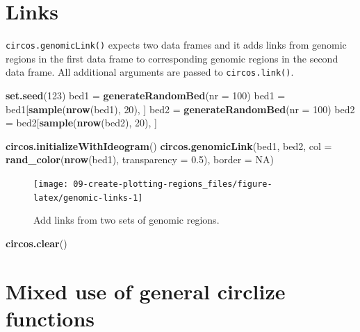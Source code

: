 \documentclass[]{book}
\newenvironment{Shaded}{\begin{snugshade}}{\end{snugshade}}
\newcommand{\KeywordTok}[1]{\textcolor[rgb]{0.13,0.29,0.53}{\textbf{#1}}}
\newcommand{\DataTypeTok}[1]{\textcolor[rgb]{0.13,0.29,0.53}{#1}}
\newcommand{\DecValTok}[1]{\textcolor[rgb]{0.00,0.00,0.81}{#1}}
\newcommand{\FloatTok}[1]{\textcolor[rgb]{0.00,0.00,0.81}{#1}}
\newcommand{\StringTok}[1]{\textcolor[rgb]{0.31,0.60,0.02}{#1}}
\newcommand{\OtherTok}[1]{\textcolor[rgb]{0.56,0.35,0.01}{#1}}
\newcommand{\NormalTok}[1]{#1}
\begin{document}
\section{Links}\label{genomic-links}

\texttt{circos.genomicLink()} expects two data frames and it adds links
from genomic regions in the first data frame to corresponding genomic
regions in the second data frame. All additional arguments are passed to
\texttt{circos.link()}.

\begin{Shaded}
\begin{Highlighting}[]
\KeywordTok{set.seed}\NormalTok{(}\DecValTok{123}\NormalTok{)}
\NormalTok{bed1 =}\StringTok{ }\KeywordTok{generateRandomBed}\NormalTok{(}\DataTypeTok{nr =} \DecValTok{100}\NormalTok{)}
\NormalTok{bed1 =}\StringTok{ }\NormalTok{bed1[}\KeywordTok{sample}\NormalTok{(}\KeywordTok{nrow}\NormalTok{(bed1), }\DecValTok{20}\NormalTok{), ]}
\NormalTok{bed2 =}\StringTok{ }\KeywordTok{generateRandomBed}\NormalTok{(}\DataTypeTok{nr =} \DecValTok{100}\NormalTok{)}
\NormalTok{bed2 =}\StringTok{ }\NormalTok{bed2[}\KeywordTok{sample}\NormalTok{(}\KeywordTok{nrow}\NormalTok{(bed2), }\DecValTok{20}\NormalTok{), ]}

\KeywordTok{circos.initializeWithIdeogram}\NormalTok{()}
\KeywordTok{circos.genomicLink}\NormalTok{(bed1, bed2, }\DataTypeTok{col =} \KeywordTok{rand_color}\NormalTok{(}\KeywordTok{nrow}\NormalTok{(bed1), }\DataTypeTok{transparency =} \FloatTok{0.5}\NormalTok{), }
    \DataTypeTok{border =} \OtherTok{NA}\NormalTok{)}
\end{Highlighting}
\end{Shaded}

\begin{figure}

{\centering \texttt{[image: 09-create-plotting-regions\_files/figure-latex/genomic-links-1]} 

}

\caption{Add links from two sets of genomic regions.}\label{fig:genomic-links}
\end{figure}

\begin{Shaded}
\begin{Highlighting}[]
\KeywordTok{circos.clear}\NormalTok{()}
\end{Highlighting}
\end{Shaded}

\section{Mixed use of general circlize
functions}\label{mixed-use-of-general-circlize-functions}
\end{document}
